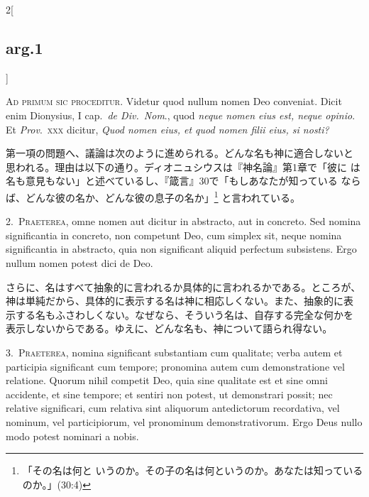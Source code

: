 \documentclass[paper=a4paper,fontsize=10pt,jafontsize=9pt,titlepage]{jlreq}
\begin{document}
\begin{paracol}{2}[\subsection{arg.1}]

{\scshape Ad primum sic proceditur}. Videtur quod nullum nomen Deo
conveniat. Dicit enim Dionysius, I cap.\ {\itshape de Div.\ Nom}., quod
{\itshape neque nomen eius est, neque opinio}. Et {\itshape Prov}.\ {\scshape xxx}
dicitur, {\itshape Quod nomen eius, et quod nomen filii eius, si nosti?}

\switchcolumn

第一項の問題へ、議論は次のように進められる。どんな名も神に適合しないと
思われる。理由は以下の通り。ディオニュシウスは『神名論』第1章で「彼に
は名も意見もない」と述べているし、『箴言』30で「もしあなたが知っている
ならば、どんな彼の名か、どんな彼の息子の名か」\footnote{「その名は何と
いうのか。その子の名は何というのか。あなたは知っているのか。」(30:4)}
と言われている。


2.~{\scshape Praeterea}, omne nomen aut dicitur in abstracto, aut in
concreto. Sed nomina significantia in concreto, non competunt Deo, cum
simplex sit, neque nomina significantia in abstracto, quia non
significant aliquid perfectum subsistens. Ergo nullum nomen potest
dici de Deo.

\switchcolumn

さらに、名はすべて抽象的に言われるか具体的に言われるかである。ところが、
神は単純だから、具体的に表示する名は神に相応しくない。また、抽象的に表
示する名もふさわしくない。なぜなら、そういう名は、自存する完全な何かを
表示しないからである。ゆえに、どんな名も、神について語られ得ない。


3.~{\scshape Praeterea}, nomina significant substantiam cum qualitate;
verba autem et participia significant cum tempore; pronomina autem cum
demonstratione vel relatione. Quorum nihil competit Deo, quia sine
qualitate est et sine omni accidente, et sine tempore; et sentiri non
potest, ut demonstrari possit; nec relative significari, cum relativa
sint aliquorum antedictorum recordativa, vel nominum, vel
participiorum, vel pronominum demonstrativorum. Ergo Deus nullo modo
potest nominari a nobis.


\end{paracol}
\end{document}
